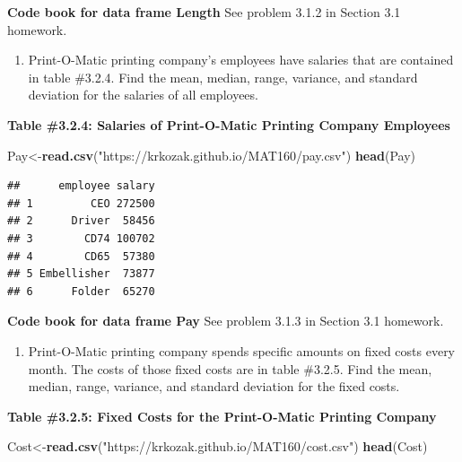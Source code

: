 \documentclass[
]{book}
\newenvironment{Shaded}{\begin{snugshade}}{\end{snugshade}}
\newcommand{\KeywordTok}[1]{\textcolor[rgb]{0.13,0.29,0.53}{\textbf{#1}}}
\newcommand{\NormalTok}[1]{#1}
\newcommand{\StringTok}[1]{\textcolor[rgb]{0.31,0.60,0.02}{#1}}
\providecommand{\tightlist}{%
  \setlength{\itemsep}{0pt}\setlength{\parskip}{0pt}}
\begin{document}
\textbf{Code book for data frame Length} See problem 3.1.2 in Section 3.1 homework.

\begin{enumerate}
\def\labelenumi{\arabic{enumi}.}
\setcounter{enumi}{2}
\tightlist
\item
  Print-O-Matic printing company's employees have salaries that are contained in table \#3.2.4. Find the mean, median, range, variance, and standard deviation for the salaries of all employees.
\end{enumerate}

\textbf{Table \#3.2.4: Salaries of Print-O-Matic Printing Company Employees}

\begin{Shaded}
\begin{Highlighting}[]
\NormalTok{Pay<-}\KeywordTok{read.csv}\NormalTok{(}\StringTok{"https://krkozak.github.io/MAT160/pay.csv"}\NormalTok{)}
\KeywordTok{head}\NormalTok{(Pay)}
\end{Highlighting}
\end{Shaded}

\begin{verbatim}
##      employee salary
## 1         CEO 272500
## 2      Driver  58456
## 3        CD74 100702
## 4        CD65  57380
## 5 Embellisher  73877
## 6      Folder  65270
\end{verbatim}

\textbf{Code book for data frame Pay} See problem 3.1.3 in Section 3.1 homework.

\begin{enumerate}
\def\labelenumi{\arabic{enumi}.}
\setcounter{enumi}{3}
\tightlist
\item
  Print-O-Matic printing company spends specific amounts on fixed costs every month. The costs of those fixed costs are in table \#3.2.5. Find the mean, median, range, variance, and standard deviation for the fixed costs.
\end{enumerate}

\textbf{Table \#3.2.5: Fixed Costs for the Print-O-Matic Printing Company}

\begin{Shaded}
\begin{Highlighting}[]
\NormalTok{Cost<-}\KeywordTok{read.csv}\NormalTok{(}\StringTok{"https://krkozak.github.io/MAT160/cost.csv"}\NormalTok{)}
\KeywordTok{head}\NormalTok{(Cost)}
\end{Highlighting}
\end{Shaded}
\end{document}
